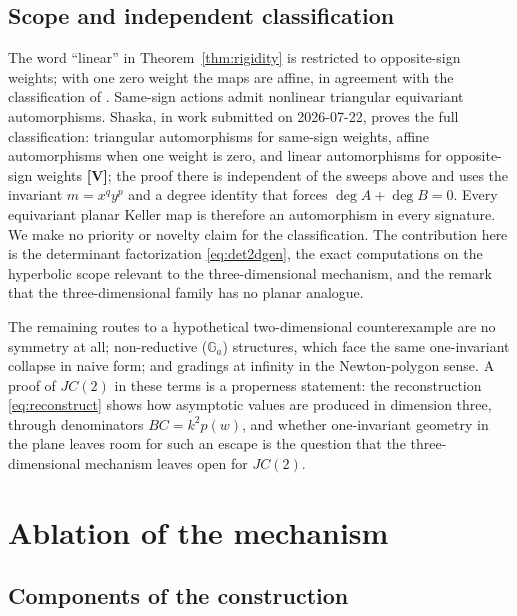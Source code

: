 \documentclass[11pt]{article}
\theoremstyle{definition}
\theoremstyle{remark}
\newcommand{\VV}{\textbf{[V]}}
\begin{document}
\subsection{Scope and independent classification}\label{sec:scope}

The word ``linear'' in Theorem~\ref{thm:rigidity} is restricted to opposite-sign weights; with one zero weight the maps are affine, in agreement with the classification of \cite{Shaska2026}. Same-sign actions admit nonlinear triangular equivariant automorphisms. Shaska, in work submitted on 2026-07-22, proves the full classification: triangular automorphisms for same-sign weights, affine automorphisms when one weight is zero, and linear automorphisms for opposite-sign weights \VV{}; the proof there is independent of the sweeps above and uses the invariant $m = x^qy^p$ and a degree identity that forces $\deg A + \deg B = 0$. Every equivariant planar Keller map is therefore an automorphism in every signature. We make no priority or novelty claim for the classification. The contribution here is the determinant factorization \eqref{eq:det2dgen}, the exact computations on the hyperbolic scope relevant to the three-dimensional mechanism, and the remark that the three-dimensional family has no planar analogue.

The remaining routes to a hypothetical two-dimensional counterexample are no symmetry at all; non-reductive ($\mathbb{G}_a$) structures, which face the same one-invariant collapse in naive form; and gradings at infinity in the Newton-polygon sense. A proof of $JC(2)$ in these terms is a properness statement: the reconstruction \eqref{eq:reconstruct} shows how asymptotic values are produced in dimension three, through denominators $BC = k^2p(w)$, and whether one-invariant geometry in the plane leaves room for such an escape is the question that the three-dimensional mechanism leaves open for $JC(2)$.

\section{Ablation of the mechanism}\label{sec:ablation}

\subsection{Components of the construction}
\end{document}
